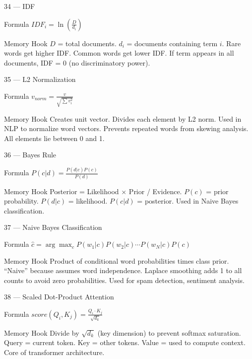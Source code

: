 \documentclass[aspectratio=169,8pt]{beamer}
\begin{document}
	\begin{frame}{34 --- IDF}
		\begin{block}{Formula}
			$IDF_i = \ln\left(\frac{D}{d_i}\right)$
		\end{block}
		\begin{block}{Memory Hook}
			$D$ = total documents. $d_i$ = documents containing term $i$. Rare words get higher IDF. Common words get lower IDF. If term appears in all documents, IDF = 0 (no discriminatory power).
		\end{block}
	\end{frame}
	
	\begin{frame}{35 --- L2 Normalization}
		\begin{block}{Formula}
			$v_{norm} = \frac{v}{\sqrt{\sum v_i^2}}$
		\end{block}
		\begin{block}{Memory Hook}
			Creates unit vector. Divides each element by L2 norm. Used in NLP to normalize word vectors. Prevents repeated words from skewing analysis. All elements lie between 0 and 1.
		\end{block}
	\end{frame}
	
	\begin{frame}{36 --- Bayes Rule}
		\begin{block}{Formula}
			$P(c|d) = \frac{P(d|c)P(c)}{P(d)}$
		\end{block}
		\begin{block}{Memory Hook}
			Posterior = Likelihood $\times$ Prior / Evidence. $P(c)$ = prior probability. $P(d|c)$ = likelihood. $P(c|d)$ = posterior. Used in Naive Bayes classification.
		\end{block}
	\end{frame}
	
	\begin{frame}{37 --- Naive Bayes Classification}
		\begin{block}{Formula}
			$\hat{c} = \arg\max_c P(w_1|c)P(w_2|c)\cdots P(w_N|c)P(c)$
		\end{block}
		\begin{block}{Memory Hook}
			Product of conditional word probabilities times class prior. ``Naive'' because assumes word independence. Laplace smoothing adds 1 to all counts to avoid zero probabilities. Used for spam detection, sentiment analysis.
		\end{block}
	\end{frame}
	
	\begin{frame}{38 --- Scaled Dot-Product Attention}
		\begin{block}{Formula}
			$score(Q_i, K_j) = \frac{Q_i \cdot K_j}{\sqrt{d_k}}$
		\end{block}
		\begin{block}{Memory Hook}
			Divide by $\sqrt{d_k}$ (key dimension) to prevent softmax saturation. Query = current token. Key = other tokens. Value = used to compute context. Core of transformer architecture.
		\end{block}
	\end{frame}
	
\end{document}

